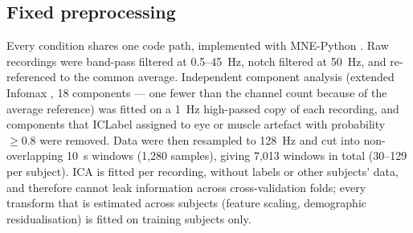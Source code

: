 \subsection{Fixed preprocessing}\label{sec:preproc}
Every condition shares one code path, implemented with MNE-Python \cite{mne}. Raw recordings were
band-pass filtered at 0.5--\SI{45}{\hertz}, notch filtered at \SI{50}{\hertz}, and re-referenced to
the common average. Independent component analysis (extended Infomax \cite{infomax}, 18 components
--- one fewer than the channel count because of the average reference) was fitted on a
\SI{1}{\hertz} high-passed copy of each recording, and components that ICLabel \cite{iclabel}
assigned to eye or muscle artefact with probability $\ge 0.8$ were removed. Data were then resampled
to \SI{128}{\hertz} and cut into non-overlapping \SI{10}{\second} windows (1,280 samples), giving
7,013 windows in total (30--129 per subject). ICA is fitted per recording, without labels or other
subjects' data, and therefore cannot leak information across cross-validation folds; every transform
that is estimated across subjects (feature scaling, demographic residualisation) is fitted on
training subjects only.

